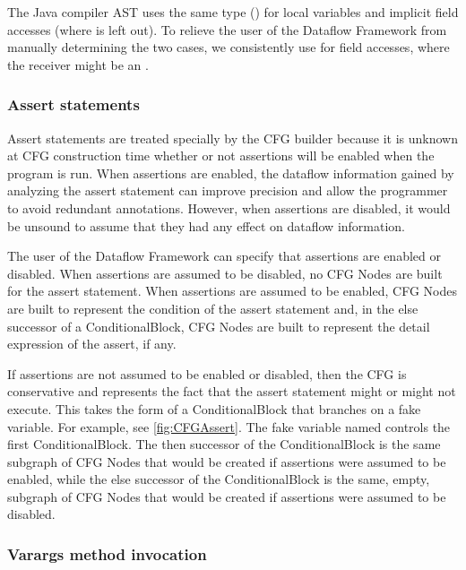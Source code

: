 The Java compiler AST uses the same type () for
local variables and implicit field accesses (where  is
left out).  To relieve the user of the Dataflow Framework from
manually determining the two cases, we consistently use
 for field accesses, where the receiver might be
an .


\subsubsection{Assert statements}
\label{sec:assert-stmts}

Assert statements are treated specially by the CFG builder because it
is unknown at CFG construction time whether or not assertions will be
enabled when the program is run.  When assertions are enabled, the
dataflow information gained by analyzing the assert statement can
improve precision and allow the programmer to avoid redundant
annotations.  However, when assertions are disabled, it would be
unsound to assume that they had any effect on dataflow information.

The user of the Dataflow Framework can specify that
assertions are enabled or disabled.  When assertions are assumed to be
disabled, no CFG Nodes are built for the assert statement.
When assertions are assumed to be enabled, CFG Nodes are built to
represent the condition of the assert statement and, in the else
successor of a ConditionalBlock, CFG Nodes are built to represent the
detail expression of the assert, if any.

If assertions are not assumed to be enabled or disabled, then
the CFG is conservative and represents the fact that the
assert statement might or might not execute.  This takes the form of a
ConditionalBlock that branches on a fake variable.  For example, see
\autoref{fig:CFGAssert}.  The fake variable named
 controls the first ConditionalBlock.
The then successor of the ConditionalBlock is the same subgraph of CFG
Nodes that would be created if assertions were assumed to be enabled,
while the else successor of the ConditionalBlock is the same, empty,
subgraph of CFG Nodes that would be created if assertions were assumed
to be disabled.



\subsubsection{Varargs method invocation}
\label{sec:varargs}

